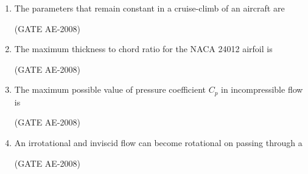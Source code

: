 \documentclass[journal,12pt,onecolumn]{IEEEtran}
\theoremstyle{remark}
\begin{document}
\begin{enumerate}
\quad

\item The parameters that remain constant in a cruise-climb of an aircraft are
\begin{enumerate}
\end{enumerate}
\hfill(GATE AE-2008)

\quad

\item The maximum thickness to chord ratio for the NACA 24012 airfoil is  
\begin{enumerate}
\end{enumerate}
\hfill(GATE AE-2008)

\quad

\item The maximum possible value of pressure coefficient \(C_p\) in incompressible flow is 
\begin{enumerate}
\end{enumerate}
\hfill(GATE AE-2008)

\quad

\item An irrotational and inviscid flow can become rotational on passing through a 
\begin{enumerate}
\end{enumerate}
\hfill(GATE AE-2008)


\end{enumerate}
\end{document}
